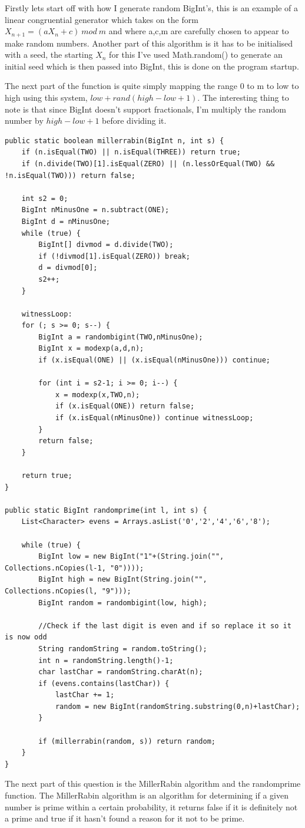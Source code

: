 \documentclass[journal,a4paper]{article}
\begin{document}
Firstly lets start off with how I generate random BigInt's, this is an example of a linear congruential generator which takes on the form $X_{n+1} = (aX_n+c)\ mod\ m$ and where a,c,m are carefully chosen to appear to make random numbers. Another part of this algorithm is it has to be initialised with a seed, the starting $X_n$ for this I've used Math.random() to generate an initial seed which is then passed into BigInt, this is done on the program startup.

The next part of the function is quite simply mapping the range 0 to m to low to high using this system, $low + rand(high-low+1)$. The interesting thing to note is that since BigInt doesn't support fractionals, I'm multiply the random number by $high-low+1$ before dividing it.

\begin{lstlisting}
public static boolean millerrabin(BigInt n, int s) {
	if (n.isEqual(TWO) || n.isEqual(THREE)) return true;
	if (n.divide(TWO)[1].isEqual(ZERO) || (n.lessOrEqual(TWO) && !n.isEqual(TWO))) return false;

	int s2 = 0;
	BigInt nMinusOne = n.subtract(ONE);
	BigInt d = nMinusOne;
	while (true) {
		BigInt[] divmod = d.divide(TWO);
		if (!divmod[1].isEqual(ZERO)) break;
		d = divmod[0];
		s2++;
	}

	witnessLoop:
	for (; s >= 0; s--) {
		BigInt a = randombigint(TWO,nMinusOne);
		BigInt x = modexp(a,d,n);
		if (x.isEqual(ONE) || (x.isEqual(nMinusOne))) continue;

		for (int i = s2-1; i >= 0; i--) {
			x = modexp(x,TWO,n);
			if (x.isEqual(ONE)) return false;
			if (x.isEqual(nMinusOne)) continue witnessLoop;
		}
		return false;
	}

	return true;
}

public static BigInt randomprime(int l, int s) {
	List<Character> evens = Arrays.asList('0','2','4','6','8');

    while (true) {
		BigInt low = new BigInt("1"+(String.join("", Collections.nCopies(l-1, "0"))));
	    BigInt high = new BigInt(String.join("", Collections.nCopies(l, "9")));
		BigInt random = randombigint(low, high);

		//Check if the last digit is even and if so replace it so it is now odd
	    String randomString = random.toString();
	    int n = randomString.length()-1;
		char lastChar = randomString.charAt(n);
        if (evens.contains(lastChar)) {
            lastChar += 1;
            random = new BigInt(randomString.substring(0,n)+lastChar);
        }

	    if (millerrabin(random, s)) return random;
	}
}
\end{lstlisting}
The next part of this question is the MillerRabin algorithm and the randomprime function. The MillerRabin algorithm is an algorithm for determining if a given number is prime within a certain probability, it returns false if it is definitely not a prime and true if it hasn't found a reason for it not to be prime.
\end{document}

